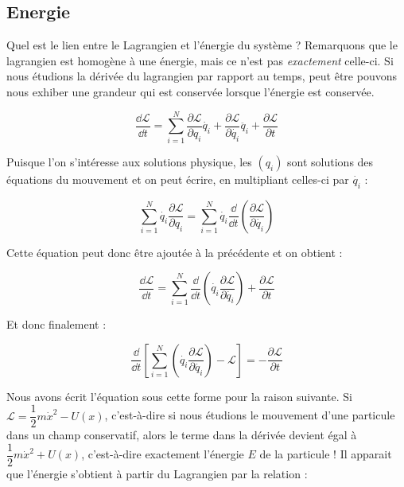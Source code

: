 \subsection{Energie}

Quel est le lien entre le Lagrangien et l'énergie du système ? Remarquons que le lagrangien est homogène à une énergie, mais ce n'est pas \textit{exactement} celle-ci. Si nous étudions la dérivée du lagrangien par rapport au temps, peut être pouvons nous exhiber une grandeur qui est conservée lorsque l'énergie est conservée. 

\begin{equation}
\dfrac{\dd \mathcal{L}}{\dd t} = \sum_{i=1}^{N}\dfrac{\partial \mathcal{L}}{\partial q_i} \dot{q_i} + \dfrac{\partial \mathcal{L}}{\partial \dot{q_i}} \ddot{q_i} + \dfrac{\partial \mathcal{L}}{\partial t}
\end{equation}

Puisque l'on s'intéresse aux solutions physique, les $(q_i)$ sont solutions des équations du mouvement et on peut écrire, en multipliant celles-ci par $\dot{q_i}$ :

\begin{equation}
\sum_{i=1}^{N}\dot{q_i} \dfrac{\partial \mathcal{L}}{\partial q_i} = \sum_{i=1}^{N} \dot{q_i}\dfrac{\dd}{\dd t} \left (\dfrac{\partial \mathcal{L}}{\partial \dot{q_i}} \right )
\end{equation}

Cette équation peut donc être ajoutée à la précédente et on obtient :

\begin{equation}
\dfrac{\dd \mathcal{L}}{\dd t} = \sum_{i=1}^{N}  \dfrac{\dd}{\dd t} \left (\dot{q_i}\dfrac{\partial \mathcal{L}}{\partial \dot{q_i}} \right ) + \dfrac{\partial \mathcal{L}}{\partial t}
\end{equation}

Et donc finalement :

\begin{equation}
 \dfrac{\dd}{\dd t} \left [  \sum_{i=1}^{N}  \left (\dot{q_i}\dfrac{\partial \mathcal{L}}{\partial \dot{q_i}} \right ) - \mathcal{L} \right ] = - \dfrac{\partial \mathcal{L}}{\partial t}
\end{equation}

Nous avons écrit l'équation sous cette forme pour la raison suivante. Si $\mathcal{L} = \dfrac{1}{2}m\dot{x}^2 - U(x)$, c'est-à-dire si nous étudions le mouvement d'une particule dans un champ conservatif, alors le terme dans la dérivée devient égal à $ \dfrac{1}{2}m\dot{x}^2 + U(x)$, c'est-à-dire exactement l'énergie $E$ de la particule ! Il apparait que l'énergie s'obtient à partir du Lagrangien par la relation :

